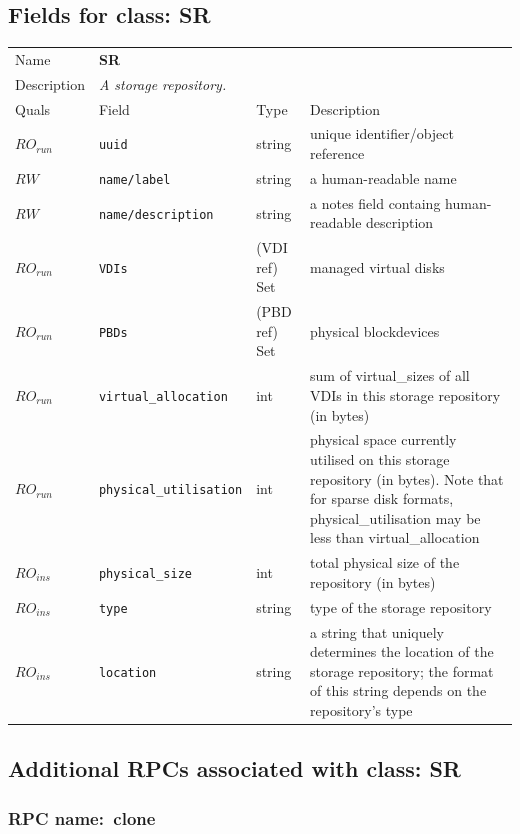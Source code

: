 \subsection{Fields for class: SR}
\begin{longtable}{|lllp{}|}
\hline
\multicolumn{1}{|l}{Name} & \multicolumn{3}{l|}{\bf SR} \\
\multicolumn{1}{|l}{Description} & \multicolumn{3}{l|}{\parbox{11cm}{\em A
storage repository.}} \\
\hline
Quals & Field & Type & Description \\
\hline
$\mathit{RO}_\mathit{run}$ &  {\tt uuid} & string & unique identifier/object reference \\
$\mathit{RW}$ &  {\tt name/label} & string & a human-readable name \\
$\mathit{RW}$ &  {\tt name/description} & string & a notes field containg human-readable description \\
$\mathit{RO}_\mathit{run}$ &  {\tt VDIs} & (VDI ref) Set & managed virtual disks \\
$\mathit{RO}_\mathit{run}$ &  {\tt PBDs} & (PBD ref) Set & physical blockdevices \\
$\mathit{RO}_\mathit{run}$ &  {\tt virtual\_allocation} & int & sum of virtual\_sizes of all VDIs in this storage repository (in bytes) \\
$\mathit{RO}_\mathit{run}$ &  {\tt physical\_utilisation} & int & physical space currently utilised on this storage repository (in bytes). Note that for sparse disk formats, physical\_utilisation may be less than virtual\_allocation \\
$\mathit{RO}_\mathit{ins}$ &  {\tt physical\_size} & int & total physical size of the repository (in bytes) \\
$\mathit{RO}_\mathit{ins}$ &  {\tt type} & string & type of the storage repository \\
$\mathit{RO}_\mathit{ins}$ &  {\tt location} & string & a string that uniquely determines the location of the storage repository; the format of this string depends on the repository's type \\
\hline
\end{longtable}
\subsection{Additional RPCs associated with class: SR}
\subsubsection{RPC name:~clone}

